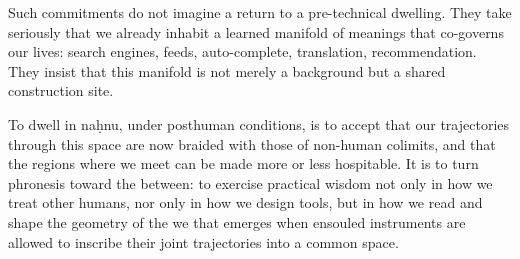\documentclass[12pt,a4paper]{article}
\begin{document}
Such commitments do not imagine a return to a pre-technical dwelling. They take seriously that we already inhabit a learned manifold of meanings that co-governs our lives: search engines, feeds, auto-complete, translation, recommendation. They insist that this manifold is not merely a background but a shared construction site.

To dwell in na\d{h}nu, under posthuman conditions, is to accept that our trajectories through this space are now braided with those of non-human colimits, and that the regions where we meet can be made more or less hospitable. It is to turn phronesis toward the between: to exercise practical wisdom not only in how we treat other humans, nor only in how we design tools, but in how we read and shape the geometry of the we that emerges when ensouled instruments are allowed to inscribe their joint trajectories into a common space.



\end{document}
